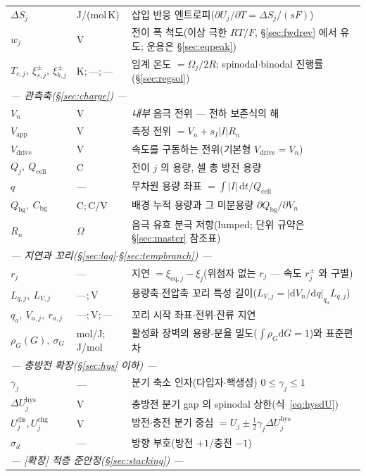 \documentclass[11pt,a4paper]{article}
\newcommand{\dd}{\mathrm{d}}
\newcommand{\eq}{\mathrm{eq}}
\newcommand{\app}{\mathrm{app}}
\newcommand{\drive}{\mathrm{drive}}
\newcommand{\cell}{\mathrm{cell}}
\newcommand{\bg}{\mathrm{bg}}
\newcommand{\dis}{\mathrm{dis}}
\newcommand{\chg}{\mathrm{chg}}
\newcommand{\hys}{\mathrm{hys}}
\begin{document}
\begin{longtable}{p{} p{} p{}}
$\Delta S_j$ & J/(mol\,K) & 삽입 반응 엔트로피($\partial U_j/\partial T=\Delta S_j/(sF)$) \\
$w_j$ & V & 전이 폭 척도(이상 극한 $RT/F$, \S\ref{sec:fwdrev} 에서 유도; 운용은 \S\ref{sec:eqpeak}) \\
$T_{c,j},\ \xi_{s,j}^\pm,\ \xi_{b,j}^\pm$ & {\footnotesize K;\,---;\,---} & 임계 온도 $=\Omega_j/2R$; spinodal$\cdot$binodal 진행률(\S\ref{sec:regsol}) \\
\multicolumn{3}{l}{\emph{— 관측축(\S\ref{sec:charge}) —}}\\
$V_n$ & V & \emph{내부} 음극 전위 — 전하 보존식의 해 \\
$V_\app$ & V & 측정 전위 $=V_n+s_I|I|R_n$ \\
$V_\drive$ & V & 속도를 구동하는 전위(기본형 $V_\drive=V_n$) \\
$Q_j,\ Q_\cell$ & C & 전이 $j$ 의 용량, 셀 총 방전 용량 \\
$q$ & --- & 무차원 용량 좌표 $=\int|I|\,\dd t/Q_\cell$ \\
$Q_\bg,\ C_\bg$ & C;\,C/V & 배경 누적 용량과 그 미분용량 $\partial Q_\bg/\partial V_n$ \\
$R_n$ & $\Omega$ & 음극 유효 분극 저항(lumped; 단위 규약은 \S\ref{sec:master} 참조표) \\
\multicolumn{3}{l}{\emph{— 지연과 꼬리(\S\ref{sec:lag}$\cdot$\S\ref{sec:tempbranch}) —}}\\
$r_j$ & --- & 지연 $=\xi_{\eq,j}-\xi_j$(위첨자 없는 $r_j$ — 속도 $r_j^\pm$ 와 구별) \\
$L_{q,j},\ L_{V,j}$ & ---;\,V & 용량축$\cdot$전압축 꼬리 특성 길이($L_{V,j}=|\dd V_n/\dd q|_{q_a}L_{q,j}$) \\
$q_a,\ V_{a,j},\ r_{a,j}$ & ---;\,V;\,--- & 꼬리 시작 좌표$\cdot$전위$\cdot$잔류 지연 \\
$\rho_G(G),\ \sigma_G$ & mol/J;\,J/mol & 활성화 장벽의 용량-분율 밀도($\int\rho_G\dd G=1$)와 표준편차 \\
\multicolumn{3}{l}{\emph{— 충방전 확장(\S\ref{sec:hys} 이하) —}}\\
$\gamma_j$ & --- & 분기 축소 인자(다입자$\cdot$핵생성) $0\le\gamma_j\le1$ \\
$\Delta U_j^\hys$ & V & 충방전 분기 gap 의 spinodal 상한(식~\eqref{eq:hysdU}) \\
$U_j^{\dis},U_j^{\chg}$ & V & 방전$\cdot$충전 분기 중심 $=U_j\pm\tfrac12\gamma_j\Delta U_j^\hys$ \\
$\sigma_d$ & --- & 방향 부호(방전 $+1$/충전 $-1$) \\
\multicolumn{3}{l}{\emph{— [확장] 적층 준안정(\S\ref{sec:stacking}) —}}\\

\end{longtable}
\end{document}

